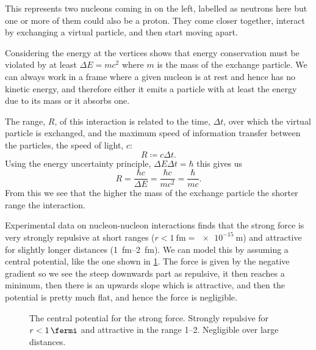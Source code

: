 \documentclass[fleqn]{NotesClass}
\begin{document}
    This represents two nucleons coming in on the left, labelled as neutrons here but one or more of them could also be a proton.
    They come closer together, interact by exchanging a virtual particle, and then start moving apart.
    
    Considering the energy at the vertices shows that energy conservation must be violated by at least \(\Delta E = mc^2\) where \(m\) is the mass of the exchange particle.
    We can always work in a frame where a given nucleon is at rest and hence has no kinetic energy, and therefore either it emits a particle with at least the energy due to its mass or it absorbs one.
    
    The range, \(R\), of this interaction is related to the time, \(\Delta t\), over which the virtual particle is exchanged, and the maximum speed of information transfer between the particles, the speed of light, \(c\):
    \begin{equation}
        R \coloneqq c\Delta t.
    \end{equation}
    Using the energy uncertainty principle, \(\Delta E \Delta t = \hbar\) this gives us
    \begin{equation}\label{eqn:R = h/mc}
        R = \frac{\hbar c}{\Delta E} = \frac{\hbar c}{mc^2} = \frac{\hbar}{mc}.
    \end{equation}
    From this we see that the higher the mass of the exchange particle the shorter range the interaction.
    
    Experimental data on nucleon-nucleon interactions finds that the strong force is very strongly repulsive at short ranges (\(r < \qty{1}{\femto\meter} = \qty{e-15}{\meter}\)) and attractive for slightly longer distances (\qtyrange{1}{2}{\femto\meter}).
    We can model this by assuming a central potential, like the one shown in \cref{fig:strong force central potential}.
    The force is given by the negative gradient so we see the steep downwards part as repulsive, it then reaches a minimum, then there is an upwards slope which is attractive, and then the potential is pretty much flat, and hence the force is negligible.
    
    \begin{figure}
        \caption{The central potential for the strong force. Strongly repulsive for \(r < \qty{1}{\fermi}\) and attractive in the range \qtyrange{1}{2}{\fermi}. Negligible over large distances.}
        \label{fig:strong force central potential}
    \end{figure}
    
\end{document}
